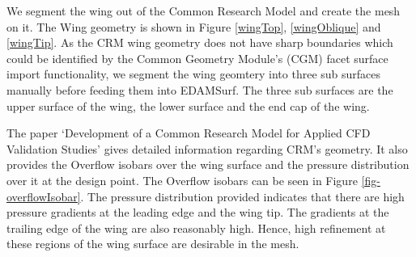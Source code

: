We segment the wing out of the Common Research Model and create the mesh on it. The Wing geometry is shown in Figure \ref{wingTop}, \ref{wingOblique} and \ref{wingTip}. As the CRM wing geometry does not have sharp boundaries which could be identified by the Common Geometry Module's (CGM) facet surface import functionality, we segment the wing geomtery into three sub surfaces manually before feeding them into EDAMSurf. The three sub surfaces are the upper surface of the wing, the lower surface and the end cap of the wing. 

The paper `Development of a Common Research Model for Applied CFD Validation Studies'\cite{vassberg2008development} gives detailed information regarding CRM's geometry. It also provides the Overflow isobars over the wing surface and the pressure distribution over it at the design point. The Overflow isobars can be seen in Figure \ref{fig-overflowIsobar}. The pressure distribution provided indicates that there are high pressure gradients at the leading edge and the wing tip. The gradients at the trailing edge of the wing are also reasonably high. Hence, high refinement at these regions of the wing surface are desirable in the mesh.

